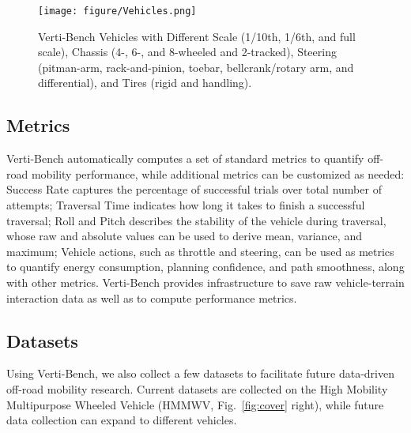 \begin{figure*}[ht]
    \centering
    \texttt{[image: figure/Vehicles.png]}
    \caption{Verti-Bench Vehicles with Different Scale (1/10th, 1/6th, and full scale), Chassis (4-, 6-, and 8-wheeled and 2-tracked), Steering (pitman-arm, rack-and-pinion,
toebar, bellcrank/rotary arm, and differential), and Tires (rigid
and handling). }
    \label{fig::vehicles}
\end{figure*}

\subsection{Metrics}
Verti-Bench automatically computes a set of standard metrics to quantify off-road mobility performance, while additional metrics can be customized as needed: Success Rate captures the percentage of successful trials over total number of attempts; Traversal Time indicates how long it takes to finish a successful traversal; Roll and Pitch describes the stability of the vehicle during traversal, whose raw and absolute values can be used to derive mean, variance, and maximum; Vehicle actions, such as throttle and steering, can be used as metrics to quantify energy consumption, planning confidence, and path smoothness, along with other metrics. Verti-Bench provides infrastructure to save raw vehicle-terrain interaction data as well as to compute performance metrics. 

\subsection{Datasets}
Using Verti-Bench, we also collect a few datasets to facilitate future data-driven off-road mobility research. Current datasets are collected on the High Mobility Multipurpose Wheeled Vehicle (HMMWV, Fig.~\ref{fig:cover} right), while future data collection can expand to different vehicles. 

